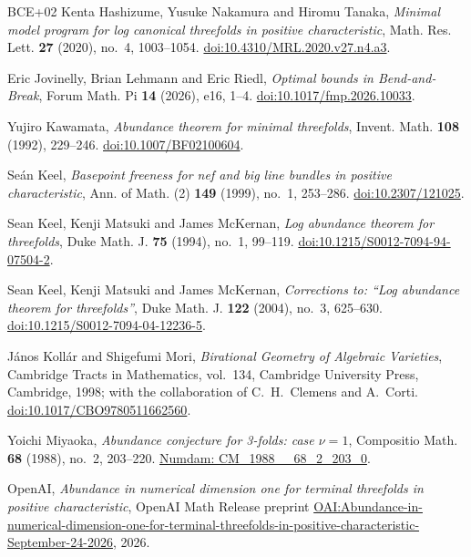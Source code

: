 \begin{thebibliography}{BCE+02}
Kenta Hashizume, Yusuke Nakamura and Hiromu Tanaka,
\emph{Minimal model program for log canonical threefolds in positive characteristic},
Math. Res. Lett. \textbf{27} (2020), no.~4, 1003--1054.
\href{https://doi.org/10.4310/MRL.2020.v27.n4.a3}{doi:10.4310/MRL.2020.v27.n4.a3}.

Eric Jovinelly, Brian Lehmann and Eric Riedl,
\emph{Optimal bounds in Bend-and-Break},
Forum Math. Pi \textbf{14} (2026), e16, 1--4.
\href{https://doi.org/10.1017/fmp.2026.10033}{doi:10.1017/fmp.2026.10033}.

Yujiro Kawamata, \emph{Abundance theorem for minimal threefolds},
Invent. Math. \textbf{108} (1992), 229--246.
\href{https://doi.org/10.1007/BF02100604}{doi:10.1007/BF02100604}.

Se\'an Keel,
\emph{Basepoint freeness for nef and big line bundles in positive characteristic},
Ann. of Math. (2) \textbf{149} (1999), no.~1, 253--286.
\href{https://doi.org/10.2307/121025}{doi:10.2307/121025}.

Sean Keel, Kenji Matsuki and James McKernan,
\emph{Log abundance theorem for threefolds},
Duke Math. J. \textbf{75} (1994), no.~1, 99--119.
\href{https://doi.org/10.1215/S0012-7094-94-07504-2}{doi:10.1215/S0012-7094-94-07504-2}.

Sean Keel, Kenji Matsuki and James McKernan,
\emph{Corrections to: ``Log abundance theorem for threefolds''},
Duke Math. J. \textbf{122} (2004), no.~3, 625--630.
\href{https://doi.org/10.1215/S0012-7094-04-12236-5}{doi:10.1215/S0012-7094-04-12236-5}.

J\'anos Koll\'ar and Shigefumi Mori,
\emph{Birational Geometry of Algebraic Varieties},
Cambridge Tracts in Mathematics, vol.~134, Cambridge University Press,
Cambridge, 1998; with the collaboration of C.~H.~Clemens and A.~Corti.
\href{https://doi.org/10.1017/CBO9780511662560}{doi:10.1017/CBO9780511662560}.

Yoichi Miyaoka, \emph{Abundance conjecture for 3-folds: case $\nu=1$},
Compositio Math. \textbf{68} (1988), no.~2, 203--220.
\href{https://www.numdam.org/item/CM_1988__68_2_203_0/}{Numdam: CM\_1988\_\_68\_2\_203\_0}.

OpenAI,
\emph{Abundance in numerical dimension one for terminal threefolds in positive characteristic},
OpenAI Math Release preprint
\href{https://github.com/openai/math/blob/main/preprints/Abundance-in-numerical-dimension-one-for-terminal-threefolds-in-positive-characteristic-September-24-2026/paper.pdf}{OAI:Abundance-in-numerical-dimension-one-for-terminal-threefolds-in-positive-characteristic-September-24-2026},
2026.


\end{thebibliography}

